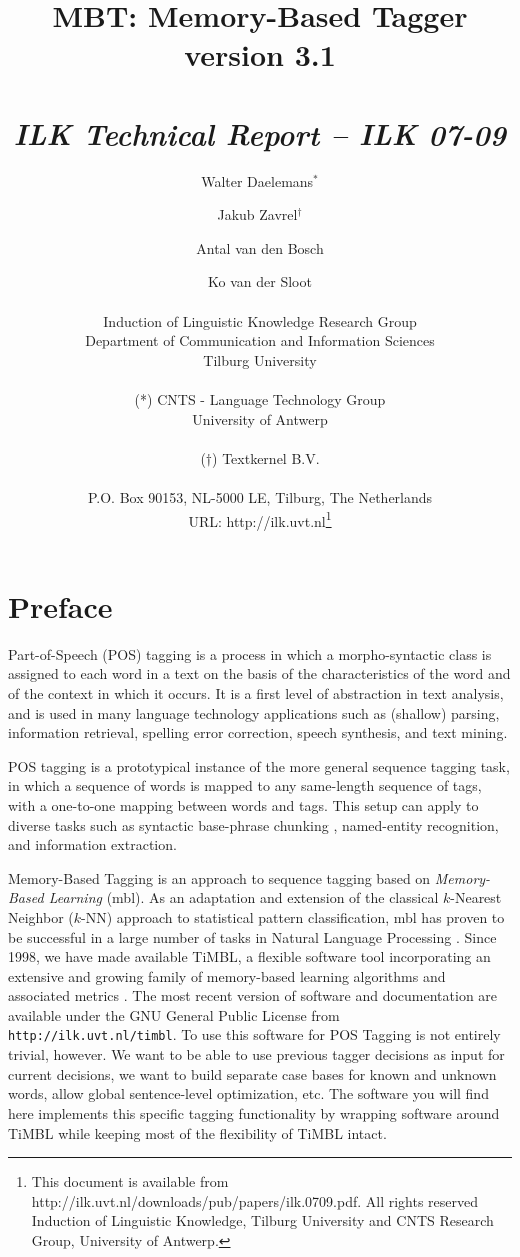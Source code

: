 \documentclass{report}
\author{Walter Daelemans$^*$ \and Jakub Zavrel$^\dagger$ \and
	Antal van den Bosch \and Ko van der Sloot\\ \ \\
	Induction of Linguistic Knowledge Research Group\\
	Department of Communication and Information Sciences\\ 
        Tilburg University \\ \\
	(*) CNTS - Language Technology Group\\
	University of Antwerp\\ \\
	($\dagger$) Textkernel B.V.\\ \\
        P.O. Box 90153, NL-5000 LE, Tilburg, The Netherlands \\ 
        URL: http://ilk.uvt.nl\thanks{This document is available from
	http://ilk.uvt.nl/downloads/pub/papers/ilk.0709.pdf. All rights reserved
	Induction of Linguistic Knowledge, Tilburg University and 
        CNTS Research Group, University of Antwerp.}}
\title{{\huge MBT: Memory-Based Tagger} \\ \vspace*{0.5cm}
{\bf version 3.1} \\ \vspace*{0.5cm}{\huge Reference Guide}\\
\vspace*{1cm} {\it ILK Technical Report -- ILK 07-09}}
\begin{document}

\maketitle

\tableofcontents

\chapter*{Preface}

Part-of-Speech (POS) tagging is a process in which a morpho-syntactic
class is assigned to each word in a text on the basis of the
characteristics of the word and of the context in which it occurs. It
is a first level of abstraction in text analysis, and is used in many
language technology applications such as (shallow) parsing,
information retrieval, spelling error correction, speech synthesis, and
text mining.

POS tagging is a prototypical instance of the more general sequence
tagging task, in which a sequence of words is mapped to any
same-length sequence of tags, with a one-to-one mapping between words
and tags. This setup can apply to diverse tasks such as syntactic
base-phrase chunking \cite{Sang+00}, named-entity recognition, and
information extraction.

Memory-Based Tagging is an approach to sequence tagging based on {\em
  Memory-Based Learning} ({\sc mbl}).  As an adaptation and extension
of the classical $k$-Nearest Neighbor ($k$-NN) approach to statistical
pattern classification, {\sc mbl} has proven to be successful in a
large number of tasks in Natural Language Processing
\cite{Daelemans+05}. Since 1998, we have made available TiMBL, a
flexible software tool incorporating an extensive and growing family
of memory-based learning algorithms and associated metrics
\cite{Daelemans+07}. The most recent version of software and
documentation are available under the GNU General Public License from
{\tt http://ilk.uvt.nl/timbl}.  To use this software for POS Tagging
is not entirely trivial, however. We want to be able to use previous
tagger decisions as input for current decisions, we want to build
separate case bases for known and unknown words, allow global
sentence-level optimization, etc.  The software you will find here
implements this specific tagging functionality by wrapping software
around TiMBL while keeping most of the flexibility of TiMBL intact.
\end{document}
